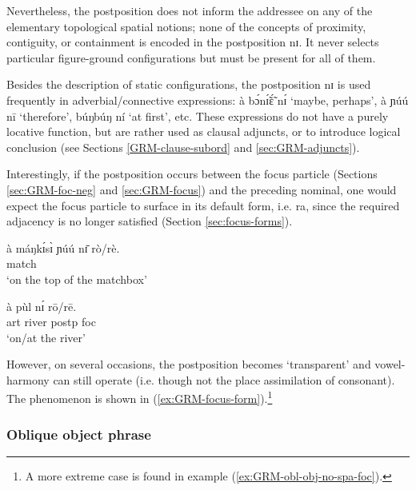 \begin{exe}
\begin{exe}
\begin{exe}
{Nevertheless, the postposition does not inform the addressee on any of the 
elementary topological spatial notions; none of the concepts of proximity, 
contiguity, or containment is encoded in  the postposition {\sls nɪ}. It never 
selects particular figure-ground configurations but must be present for all of 
them. 

Besides the description of static configurations, the postposition {\sls nɪ}  
is 
used frequently in adverbial/connective expressions: {\sls à bɔ́nɪ̃́ɛ̃́ nɪ́} 
`maybe, perhaps', {\sls à ɲúú nī} `therefore', {\sls búŋbúŋ ní} `at 
first', etc. These expressions do not have a purely locative function, but are 
rather used as clausal adjuncts,  or to introduce logical conclusion (see 
Sections   \ref{GRM-clause-subord} and \ref{sec:GRM-adjuncts}). 



Interestingly, if the postposition  occurs between the focus particle 
(Sections \ref{sec:GRM-foc-neg} and \ref{sec:GRM-focus}) 
and
the preceding nominal, one would expect  the focus particle to surface in its
default form, i.e. {\sls ra},  since the required adjacency is no longer 
satisfied
(Section  \ref{sec:focus-forms}). 


\ea\label{ex:GRM-focus-form}

\ea\label{ex:GRM-foc-form-X}
 
\ex\label{ex:GRM-foc-form-1}
\gll  à máŋkɪ́sɪ̀ ɲúú nɪ̄ rò/rè.\\
    {\art} {match} {\reln} {\postp} {\foc}\\
\glt `on the top of the matchbox'

\ex\label{ex:GRM-foc-form-2}
\gll  à  pùl nɪ́ rō/rē.\\
    {\sc art} {river} {\sc postp}  {\sc foc}\\
\glt `on/at the river'

\z 
 \z

However, on several occasions, the postposition becomes `transparent' and 
vowel-harmony can still operate (i.e. though not the place 
assimilation of consonant). The
phenomenon is shown in (\ref{ex:GRM-focus-form}).\footnote{A more extreme case
is found in example (\ref{ex:GRM-obl-obj-no-spa-foc}).}



\subsubsection{Oblique object phrase}
\label{sec:GRM-obl-phrase}

}
\end{exe}
\end{exe}
\end{exe}
